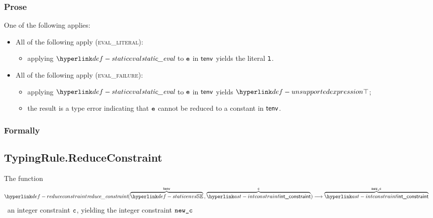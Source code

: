 \subsubsection{Prose}
One of the following applies:
\begin{itemize}
  \item All of the following apply (\textsc{eval\_literal}):
  \begin{itemize}
    \item applying $\staticeval$ to $\texttt{e}$ in $\textsf{tenv}$ yields the literal $\texttt{l}$\ProseOrTypeError.
  \end{itemize}

  \item All of the following apply (\textsc{eval\_failure}):
  \begin{itemize}
    \item applying $\staticeval$ to $\texttt{e}$ in $\textsf{tenv}$ yields $\CannotBeTransformed$;
    \item the result is a type error indicating that $\texttt{e}$ cannot be reduced to a constant in $\textsf{tenv}$.
  \end{itemize}
\end{itemize}


\subsubsection{Formally}

\subsection{TypingRule.ReduceConstraint \label{sec:TypingRule.ReduceConstraint}}
\hypertarget{def-reduceconstraint}{}
The function
\[
\reduceconstraint(
  \overname{\staticenvs}{\tenv} \aslsep
  \overname{\intconstraint}{\vc}
) \aslto
\overname{\intconstraint}{\newc}
\]
\symbolicallysimplifies\ an integer constraint $\texttt{c}$, yielding the integer constraint $\texttt{new\_c}$

